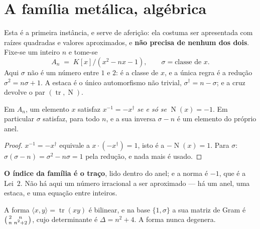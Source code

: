 \documentclass[livro.tex]{subfiles}
\begin{document}
\section{A família metálica, algébrica}\label{sec:metalica-alg}

\noindent Esta é a primeira instância, e serve de aferição: ela costuma ser apresentada com
raízes quadradas e valores aproximados, e \textbf{não precisa de nenhum dos dois}. Fixe-se um
inteiro $n$ e tome-se
\[
  A_n \;=\; K[x]\big/(x^{2}-nx-1), \qquad \sigma = \text{classe de } x .
\]
Aqui $\sigma$ não é um número entre $1$ e $2$: é a classe de $x$, e a única regra é a redução
$\sigma^{2}=n\sigma+1$. A estaca é o único automorfismo não trivial, $\sigma^{\dagger}=n-\sigma$;
e a cruz devolve o par $(\operatorname{tr},\operatorname{N})$.

\begin{proposicao}\label{prop:lei2norma}
Em $A_n$, um elemento $x$ satisfaz $x^{-1}=-x^{\dagger}$ \emph{se e só se} $\operatorname{N}(x)=-1$.
Em particular $\sigma$ satisfaz, para todo $n$, e a sua inversa $\sigma-n$ é um elemento do próprio
anel.
\end{proposicao}

\begin{proof}
$x^{-1}=-x^{\dagger}$ equivale a $x\cdot(-x^{\dagger})=1$, isto é a $-\operatorname{N}(x)=1$. Para
$\sigma$: $\sigma(\sigma-n)=\sigma^{2}-n\sigma=1$ pela redução, e nada mais é usado.
\end{proof}



\noindent \textbf{O índice da família é o traço}, lido dentro do anel; e a norma é $-1$, que é a
Lei~$2$. Não há aqui um número irracional a ser aproximado --- há um anel, uma estaca, e uma
equação entre inteiros.

\begin{proposicao}\label{prop:tracoform}
A forma $\langle x,y\rangle = \operatorname{tr}(xy)$ é bilinear, e na base $\{1,\sigma\}$ a sua
matriz de Gram é $\begin{psmallmatrix}2&n\\ n&n^{2}+2\end{psmallmatrix}$, cujo determinante é
$\Delta = n^{2}+4$. A forma nunca degenera.
\end{proposicao}
\end{document}
